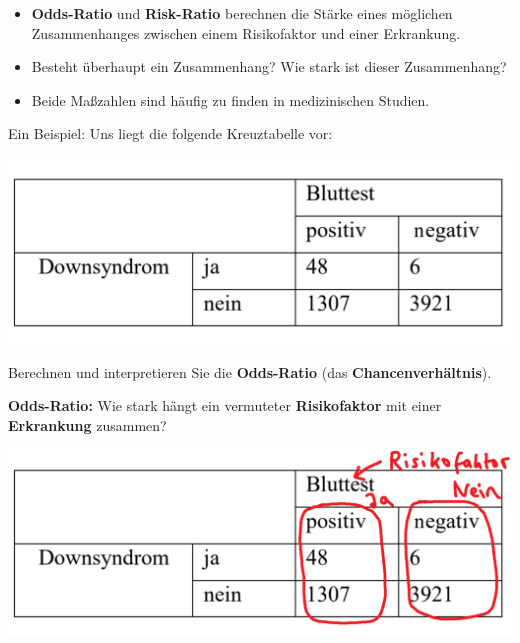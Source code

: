 \documentclass[t,11pt,aspectratio=169]{beamer}
\begin{document}
	
\begin{frame}
	\begin{itemize}
		\item \textbf{Odds-Ratio} und \textbf{Risk-Ratio} berechnen die Stärke eines möglichen Zusammenhanges zwischen einem Risikofaktor und einer Erkrankung.
		\item Besteht überhaupt ein Zusammenhang? Wie stark ist dieser Zusammenhang?
		\item Beide Maßzahlen sind häufig zu finden in medizinischen Studien.
	\end{itemize}
\end{frame}	
	
\begin{frame}
\begin{block}{Ein Beispiel:}
Uns liegt die folgende Kreuztabelle vor:
\begin{center}
	\includegraphics[scale=0.4]{tabelle.png}
\end{center}
Berechnen und interpretieren Sie die \textbf{Odds-Ratio} (das \textbf{Chancenverhältnis}).
\end{block}
\pause
\vfill
\textbf{Odds-Ratio:} Wie stark hängt ein vermuteter \textbf{Risikofaktor} mit einer \textbf{Erkrankung} zusammen?
\vfill
\end{frame}

\begin{frame}
\begin{center}
\includegraphics[width=\textwidth]{tabelle2.png}
\end{center}
\end{frame}
\end{document}
